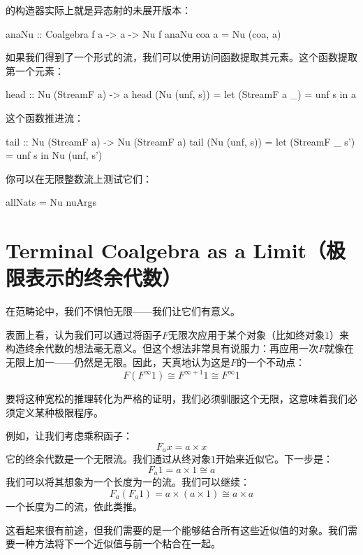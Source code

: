 \documentclass[DaoFP]{subfiles}
\begin{document}
    的构造器实际上就是异态射的未展开版本：
    \begin{haskell}
        anaNu :: Coalgebra f a -> a -> Nu f
        anaNu coa a = Nu (coa, a)
    \end{haskell}

    如果我们得到了一个形式的流，我们可以使用访问函数提取其元素。这个函数提取第一个元素：
    \begin{haskell}
        head :: Nu (StreamF a) -> a
        head (Nu (unf, s)) =
        let (StreamF a _) = unf s
        in a
    \end{haskell}
    这个函数推进流：
    \begin{haskell}
        tail :: Nu (StreamF a) -> Nu (StreamF a)
        tail (Nu (unf, s)) =
        let (StreamF _ s') = unf s
        in Nu (unf, s')
    \end{haskell}
    你可以在无限整数流上测试它们：
    \begin{haskell}
        allNats = Nu nuArgs
    \end{haskell}

    \section{Terminal Coalgebra as a Limit（极限表示的终余代数）}

    在范畴论中，我们不惧怕无限——我们让它们有意义。

    表面上看，认为我们可以通过将函子$F$无限次应用于某个对象（比如终对象$1$）来构造终余代数的想法毫无意义。但这个想法非常具有说服力：再应用一次$F$就像在无限上加一——仍然是无限。因此，天真地认为这是$F$的一个不动点：
    \[ F (F^{\infty} 1) \cong F^{\infty + 1} 1 \cong F^{\infty} 1\]

    要将这种宽松的推理转化为严格的证明，我们必须驯服这个无限，这意味着我们必须定义某种极限程序。

    例如，让我们考虑乘积函子：
    \[F_a x = a \times x \]
    它的终余代数是一个无限流。我们通过从终对象$1$开始来近似它。下一步是：
    \[ F_a 1 = a \times 1 \cong a \]
    我们可以将其想象为一个长度为一的流。我们可以继续：
    \[ F_a (F_a 1) = a \times (a \times 1) \cong a \times a \]
    一个长度为二的流，依此类推。

    这看起来很有前途，但我们需要的是一个能够结合所有这些近似值的对象。我们需要一种方法将下一个近似值与前一个粘合在一起。
\end{document}
